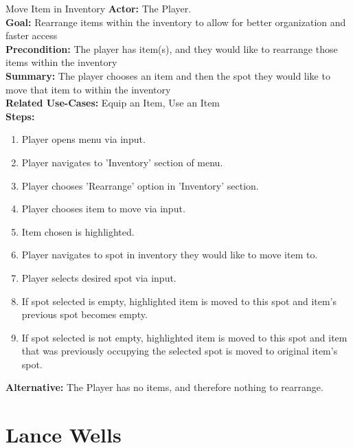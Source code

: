 \documentclass[12pt]{report}
\begin{document}
\begin{subsection}{Move Item in Inventory}
\textbf{Actor:} The Player. \\
\textbf{Goal:} Rearrange items within the inventory to allow for better organization and faster access \\
\textbf{Precondition:} The player has item(s), and they would like to rearrange those items within the inventory \\
\textbf{Summary:} The player chooses an item and then the spot they would like to move that item to within the inventory \\
\textbf{Related Use-Cases:} Equip an Item, Use an Item \\
\textbf{Steps:}
\begin{enumerate}
	\item Player opens menu via input.
	\item Player navigates to 'Inventory' section of menu.
	\item Player chooses 'Rearrange' option in 'Inventory' section.
	\item Player chooses item to move via input.
	\item Item chosen is highlighted.
	\item Player navigates to spot in inventory they would like to move item to.
	\item Player selects desired spot via input.
	\item If spot selected is empty, highlighted item is moved to this spot and item's previous spot becomes empty.
	\item If spot selected is not empty, highlighted item is moved to this spot and item that was previously occupying the selected spot is moved to original item's spot.
\end{enumerate}
\textbf{Alternative:} The Player has no items, and therefore nothing to rearrange.
\end{subsection}




\section{Lance Wells}
\end{document}
